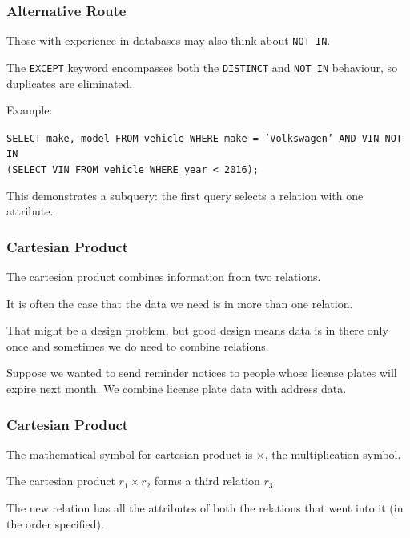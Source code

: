 \begin{frame}
\frametitle{Alternative Route}

Those with experience in databases may also think about \texttt{NOT IN}. 

The \texttt{EXCEPT} keyword encompasses both the \texttt{DISTINCT} and \texttt{NOT IN} behaviour, so duplicates are eliminated. 

Example:

\texttt{SELECT make, model FROM vehicle WHERE make = 'Volkswagen' AND 
VIN NOT IN\\ (SELECT VIN FROM vehicle WHERE year < 2016);}

This demonstrates a subquery: the first query selects a relation with one attribute.  

\end{frame}



\begin{frame}
\frametitle{Cartesian Product}

The \alert{cartesian product} combines information from two relations. 

It is often the case that the data we need is in more than one relation. 

That might be a design problem, but good design means data is in there only once and sometimes we do need to combine relations. 

Suppose we wanted to send reminder notices to people whose license plates will expire next month. We combine license plate data with address data. 

\end{frame}



\begin{frame}
\frametitle{Cartesian Product}


The mathematical symbol for cartesian product is $\times$, the multiplication symbol. 

The cartesian product $r_{1} \times r_{2}$ forms a third relation $r_{3}$.

 The new relation has all the attributes of both the relations that went into it (in the order specified). 

\end{frame}



